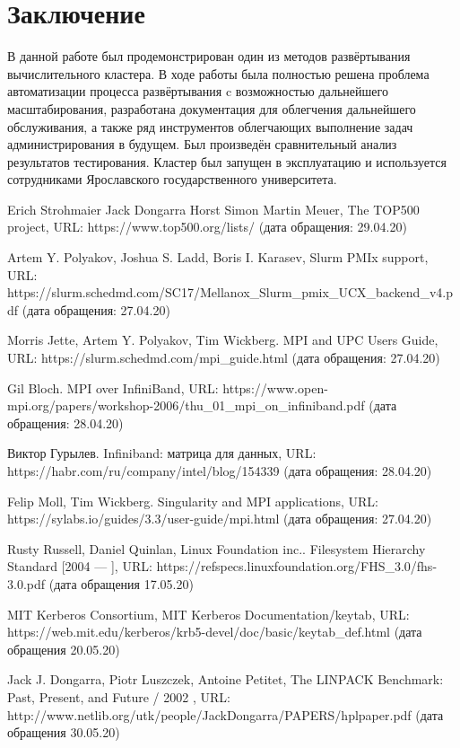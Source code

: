 \documentclass[a4paper]{extarticle}
\begin{document}
\newpage

\section*{Заключение}
В данной работе был продемонстрирован один из методов развёртывания вычислительного кластера.
В ходе работы была полностью решена проблема автоматизации процесса развёртывания c возможностью дальнейшего масштабирования, разработана документация для облегчения дальнейшего обслуживания, а  также ряд инструментов облегчающих выполнение задач администрирования в будущем.  Был произведён сравнительный анализ результатов тестирования. Кластер был запущен в эксплуатацию и используется сотрудниками Ярославского государственного университета.

\newpage


\begin{thebibliography}{99}
Erich Strohmaier Jack Dongarra Horst Simon Martin Meuer, The TOP500 project,
URL: https://www.top500.org/lists/ (дата обращения: 29.04.20)


Artem Y. Polyakov, Joshua S. Ladd, Boris I. Karasev, Slurm PMIx support,
URL: https://slurm.schedmd.com/SC17/Mellanox\_Slurm\_pmix\_UCX\_backend\_v4.pdf (дата обращения: 27.04.20)

Morris Jette, Artem Y. Polyakov,  Tim Wickberg. MPI and UPC Users Guide,
URL: https://slurm.schedmd.com/mpi\_guide.html (дата обращения: 27.04.20)

Gil Bloch. MPI over InfiniBand,
URL: https://www.open-mpi.org/papers/workshop-2006/thu\_01\_mpi\_on\_infiniband.pdf (дата обращения: 28.04.20)

Виктор Гурылев. Infiniband: матрица для данных,
URL: https://habr.com/ru/company/intel/blog/154339 (дата обращения: 28.04.20)

Felip Moll,  Tim Wickberg. Singularity and MPI applications,
URL: https://sylabs.io/guides/3.3/user-guide/mpi.html (дата обращения: 27.04.20)

Rusty Russell, Daniel Quinlan, Linux Foundation inc.. Filesystem Hierarchy Standard [2004 --- ],
URL: https://refspecs.linuxfoundation.org/FHS\_3.0/fhs-3.0.pdf (дата обращения 17.05.20)

MIT Kerberos Consortium, MIT Kerberos Documentation/keytab,
URL: https://web.mit.edu/kerberos/krb5-devel/doc/basic/keytab\_def.html (дата обращения 20.05.20)


Jack J. Dongarra, Piotr Luszczek, Antoine Petitet, The LINPACK Benchmark: Past, Present, and Future / 2002 ,
URL: http://www.netlib.org/utk/people/JackDongarra/PAPERS/hplpaper.pdf (дата обращения 30.05.20)
\end{thebibliography}
\end{document}
